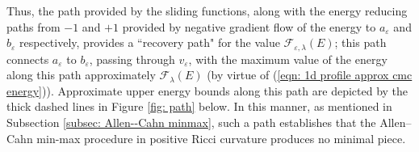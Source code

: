 \documentclass[11pt]{article}
\begin{document}
Thus, the path provided by the sliding functions, along with the energy reducing paths from $-1$ and $+1$ provided by negative gradient flow of the energy to $a_\varepsilon$ and $b_\varepsilon$ respectively, provides a “recovery path" for the value $\mathcal{F}_{\varepsilon,\lambda}(E)$; this path connects $a_\varepsilon$ to $b_\varepsilon$, passing through $v_\varepsilon$, with the maximum value of the energy along this path approximately $\mathcal{F}_\lambda(E)$ (by virtue of (\ref{eqn: 1d profile approx cmc energy})). Approximate upper energy bounds along this path are depicted by the thick dashed lines in Figure \ref{fig: path} below. In this manner, as mentioned in Subsection \ref{subsec: Allen--Cahn minmax}, such a path establishes that the Allen--Cahn min-max procedure in positive Ricci curvature produces no minimal piece.
\begin{figure}[H]
\centering
\captionsetup{justification=justified,margin=1cm}
\begin{tikzpicture}[x=0.75pt,y=0.75pt,yscale=-1,xscale=1]


\end{tikzpicture}
\end{figure}
\end{document}
